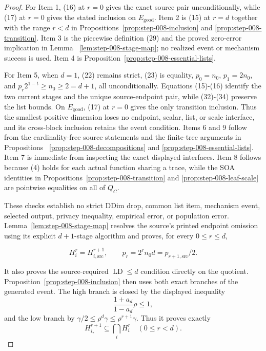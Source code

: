 \begin{proof}
For Item 1, (16) at \(r=0\) gives the exact source pair unconditionally,
while (17) at \(r=0\) gives the stated inclusion on
\(E_{\mathrm{good}}\). Item 2 is (15) at \(r=d\) together with the range
\(r<d\) in Propositions~\ref{prop:step-008-inclusion} and
\ref{prop:step-008-transition}. Item 3 is the piecewise definition (29)
and the proved zero-error implication in Lemma
~\ref{lem:step-008-stage-map}; no realized event or mechanism success is
used. Item 4 is Proposition~\ref{prop:step-008-essential-lists}.

For Item 5, when \(d=1\), (22) remains strict, (23) is equality,
\(p_0=n_0\), \(p_1=2n_0\), and
\(p_r2^{1-t}\ge n_0\ge2=d+1\), all unconditionally. Equations (15)-(16)
identify the two current stages and the unique source-endpoint pair, while
(32)-(34) preserve the list bounds. On \(E_{\mathrm{good}}\), (17) at
\(r=0\) gives the only transition inclusion. Thus the smallest positive
dimension loses no endpoint, scalar, list, or scale interface, and its
cross-block inclusion retains the event condition. Items 6 and 9 follow
from the cardinality-free source
statements and the finite-tree arguments in Propositions
~\ref{prop:step-008-decompositions} and
\ref{prop:step-008-essential-lists}. Item 7 is immediate from inspecting
the exact displayed interfaces. Item 8 follows because (4) holds for each
actual function sharing a trace, while the SOA identities in
Propositions~\ref{prop:step-008-transition} and
\ref{prop:step-008-leaf-scale} are pointwise equalities on all of \(Q_C\).

These checks establish no strict DDim drop, common list item, mechanism
event, selected output, privacy inequality, empirical error, or population
error. 
Lemma~\ref{lem:step-008-stage-map} resolves the source's printed endpoint
omission using its explicit \(d+1\)-stage algorithm and proves, for every
\(0\le r\le d\),

\[
 H_i^r=H_{i,\mathrm{src}}^{r+1},
 \qquad
 p_r=2^rn_0d=p_{r+1,\mathrm{src}}/2.
\]

It also proves the source-required \(\operatorname{LD}\le d\) condition
directly on the quotient. Proposition~\ref{prop:step-008-inclusion} then
uses both exact branches of the  generated event. The high branch
is closed by the displayed inequality
\[
 \frac{1+a_d}{1-a_d}\rho\le1,
\]
and the low branch by
\(\gamma/2\le\rho^d\gamma\le\rho^{r+1}\gamma\). Thus it proves exactly
\[
 H_{i_*}^{r+1}\subseteq\bigcap_iH_i^r
 \quad(0\le r<d).
\]


\end{proof}
